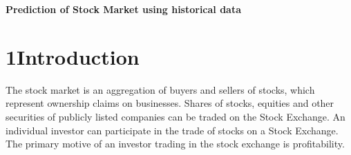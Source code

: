\documentclass[12pt]{article}
\renewcommand{\headrulewidth}{0pt}
\begin{document}
\begin{justify}
\textit{\textcolor[HTML]{00000A}{ }}


\newpage



\newpage

\end{justify}\par

\begin{Center}
{\fontsize{14pt}{16.8pt}\selectfont \textbf{ }\par}
\end{Center}\par

\begin{Center}
{\fontsize{16pt}{19.2pt}\selectfont \textbf{Prediction of Stock Market using historical data}\par}
\end{Center}\par

\begin{Center}
{\fontsize{14pt}{16.8pt}\selectfont \textbf{ }\par}
\end{Center}\par

 \par


\tableofcontents
\listoffigures
\listoftables
\newpage
\setlength\arrayrulewidth{0.4pt}
\renewcommand{\headrulewidth}{0.4pt}

\vspace{\baselineskip}

\vspace{\baselineskip}

\frontmatter
{}
\rhead{\thepage}
\linespread{1.25}
\begin{justify}
 
\end{justify}\par

\section*{1\hspace*{10pt}Introduction }
\begin{justify}
The stock market is an aggregation of buyers and sellers of stocks, which represent ownership claims on businesses. Shares of stocks, equities and other securities of publicly listed companies can be traded on the Stock Exchange. An individual investor can participate in the trade of stocks on a Stock Exchange. The primary motive of an investor trading in the stock exchange is profitability.
\end{justify}\par
\end{document}
